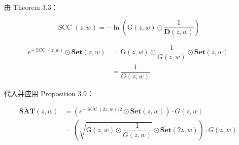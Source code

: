 \documentclass[10pt,a4paper,oneside]{article}
\begin{document}
由 Theorem 3.3：

\[
\operatorname{SCC}(z,w) = -\ln\left(\mathrm G(z,w) \odot \dfrac{1}{\mathbf D(z,w)}\right)\]

$$
\begin{aligned}e^{-\operatorname{SCC}(z,w)} \odot \mathbf{Set}(z,w) &=\mathrm G(z,w) \odot \dfrac{1}{G(z,w)} \odot \mathbf{Set}(z,w)\\
&= \dfrac{1}{G(z,w)}
\end{aligned}
$$

代入并应用 Proposition 3.9：

$$
\begin{aligned}
\ddot{\mathbf{SAT}}(z,w) &= \left(e^{-\operatorname{SCC}(2z,w)/2} \odot \ddot{\mathbf{Set}}(z,w)\right)\cdot G(z,w)\\
&= \left(\sqrt{\mathrm G(z,w) \odot \dfrac{1}{G(z,w)}} \odot \ddot{\mathbf{Set}}(2z,w)\right)\cdot G(z,w)
\end{aligned}
$$




\end{document}
